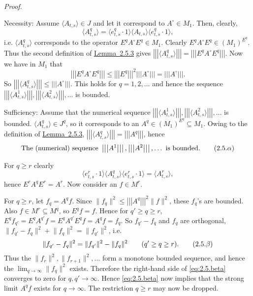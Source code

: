 \documentclass[b5paper,twoside]{article}
\newcommand{\lemref}[2]{\hyperref[#1]{\mbox{Lemma~#2}}}
\theoremstyle{mvnplain}
\renewenvironment{proof}[1][Proof]{%
  \par\addvspace{0.35\baselineskip}%
  \noindent\textit{#1.}\ \normalfont\ignorespaces
}{%
  \par\addvspace{0.35\baselineskip}%
}
\newcommand{\M}{\mathbf M}
\newcommand{\OpNorm}[1]{\left\lvert\left\lvert\left\lvert#1\right\rvert\right\rvert\right\rvert}
\def\M{M}%
\def\mathfrak#1{#1}%
\begin{document}
\begin{proof}
Necessity: Assume $\langle A_{t,s}\rangle\in\mathfrak J$ and let it
correspond to $A^{\circ}\in\M_1$.  Then, clearly,
\[
  \langle A^q_{t,s}\rangle
  =\langle e^q_{t,s}\cdot1\rangle\langle A_{t,s}\rangle
   \langle e^q_{t,s}\cdot1\rangle,
\]
i.e. $\langle A^q_{t,s}\rangle$ corresponds to the operator
$E^qA^{\circ}E^q\in\M_1$.  Clearly
$E^qA^{\circ}E^q\in(\M_1)^{E^q}$.  Thus the second definition of
\lemref{lem:2.5.3}{2.5.3} gives
$\OpNorm{\langle A^q_{t,s}\rangle}=\OpNorm{E^qA^{\circ}E^q}$.
Now we have in $\M_1$ that
\[
  \OpNorm{E^qA^{\circ}E^q}
  \leq\OpNorm{E^q}^{2}\OpNorm{A^{\circ}}
  =\OpNorm{A^{\circ}}.
\]
So $\OpNorm{\langle A^q_{t,s}\rangle}\leq\OpNorm{A^{\circ}}$.  This holds
for $q=1,2,\ldots$ and hence the sequence
$\OpNorm{\langle A^1_{t,s}\rangle},
 \OpNorm{\langle A^2_{t,s}\rangle},\ldots$ is bounded.

Sufficiency: Assume that the numerical sequence
$\OpNorm{\langle A^1_{t,s}\rangle},
 \OpNorm{\langle A^2_{t,s}\rangle},\ldots$ is bounded.
$\langle A^q_{t,s}\rangle\in\mathfrak J^q$, so it corresponds to an
$A^q\in(\M_1)^{E^q}\subseteq\M_1$.  Owing to the definition of
\lemref{lem:2.5.3}{2.5.3},
$\OpNorm{\langle A^q_{t,s}\rangle}=\OpNorm{A^q}$, hence
\begin{equation}
  \text{The (numerical) sequence }
  \OpNorm{A^1},\OpNorm{A^2},\ldots\text{ is bounded.}
  \tag{2.5.\ensuremath{\alpha}}\label{eq:2.5.alpha}
\end{equation}

For $q\geq r$ clearly
\[
  \langle e^r_{t,s}\cdot1\rangle
  \langle A^q_{t,s}\rangle
  \langle e^r_{t,s}\cdot1\rangle
  =\langle A^r_{t,s}\rangle,
\]
hence $E^rA^qE^r=A^r$.  Now consider an $f\in\mathfrak M^r$.

For $q\geq r$, let $f_q=A^qf$.  Since
$\lVert f_q\rVert^2\leq\OpNorm{A^q}^{2}\lVert f\rVert^2$, these $f_q$'s
are bounded.  Also $f\in\mathfrak M^r\subseteq\mathfrak M^q$, so
$E^qf=f$.  Hence for $q'\geq q\geq r$,
$E^qf_{q'}=E^qA^{q'}f=E^qA^{q'}E^qf=A^qf=f_q$.  So $f_{q'}-f_q$ and
$f_q$ are orthogonal,
$\lVert f_{q'}-f_q\rVert^2+\lVert f_q\rVert^2=\lVert f_{q'}\rVert^2$,
i.e.
\begin{equation}
  \lVert f_{q'}-f_q\rVert^2
  =\lVert f_{q'}\rVert^2-\lVert f_q\rVert^2
  \qquad(q'\geq q\geq r).
  \tag{2.5.\ensuremath{\beta}}\label{eq:2.5.beta}
\end{equation}
Thus the $\lVert f_r\rVert^2,\lVert f_{r+1}\rVert^2,\ldots$ form a
monotone bounded sequence, and hence the
$\lim_{q\to\infty}\lVert f_q\rVert^2$ exists.  Therefore the right-hand
side of \eqref{eq:2.5.beta} converges to zero for $q,q'\to\infty$.  Hence
\eqref{eq:2.5.beta} now implies that the strong limit $A^qf$ exists for
$q\to\infty$.  The restriction $q\geq r$ may now be dropped.


\end{proof}
\end{document}
